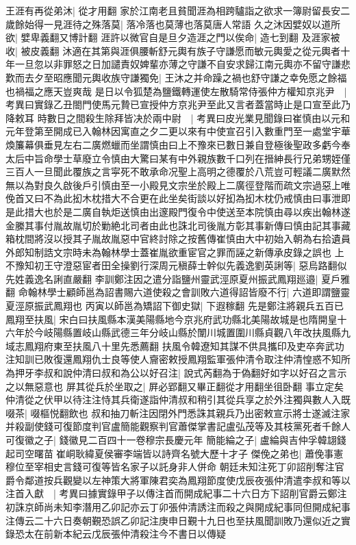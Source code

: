 王涯有再從弟沐|{
	從才用翻}
家於江南老且貧聞涯為相跨驢詣之欲求一簿尉留長安二歲餘始得一見涯待之殊落莫|{
	落冷落也莫薄也落莫唐人常語}
久之沐因嬖奴以道所欲|{
	嬖卑義翻又博計翻}
涯許以微官自是旦夕造涯之門以俟命|{
	造七到翻}
及涯家被收|{
	被皮義翻}
沐適在其第與涯俱腰斬舒元輿有族子守謙愿而敏元輿愛之從元輿者十年一旦忽以非罪怒之日加譴責奴婢輩亦薄之守謙不自安求歸江南元輿亦不留守謙悲歎而去夕至昭應聞元輿收族守謙獨免|{
	王沐之并命躁之禍也舒守謙之幸免愿之餘福也禍福之應天豈爽哉}
是日以令狐楚為鹽鐵轉運使左散騎常侍張仲方權知京兆尹　|{
	考異曰實錄乙丑閤門使馬元贄已宣授仲方京兆尹至此又言者蓋當時止是口宣至此乃降敕耳}
時數日之間殺生除拜皆决於兩中尉　|{
	考異曰皮光業見聞錄曰崔慎由以元和元年登第至開成已入翰林因寓直之夕二更以來有中使宣召引入數重門至一處堂宇華煥簾幕俱垂見左右二廣燃蠟而坐謂慎由曰上不豫來已數日兼自登極後聖政多虧今奉太后中旨命學士草廢立令慎由大驚曰某有中外親族數千口列在搢紳長行兄弟甥姪僅三百人一旦聞此覆族之言寜死不敢承命况聖上高明之德覆於八荒豈可輕議二廣默然無以為對良久啟後戶引慎由至一小殿見文宗坐於殿上二廣徑登階而疏文宗過惡上唯俛首又曰不為此抝木枕措大不合更在此坐矣街談以好抝為抝木枕仍戒慎由曰事泄即是此措大也於是二廣自執炬送慎由出邃殿門復令中使送至本院慎由尋以疾出翰林遂金縢其事付胤故胤切於勦絶北司者由此也誅北司後胤方彰其事新傳曰慎由記其事藏箱枕間將沒以授其子胤故胤惡中官終討除之按舊傳崔慎由大中初始入朝為右拾遺員外郎知制誥文宗時未為翰林學士蓋崔胤欲重宦官之罪而誣之新傳承皮錄之誤也}
上不豫知初王守澄惡宦者田全操劉行深周元稹薛士幹似先義逸劉英誗等|{
	惡烏路翻似先姓義逸名誗直嚴翻}
李訓鄭注因之遣分詣鹽州靈武涇原夏州振武鳳翔廵邉|{
	夏戶雅翻}
命翰林學士顧師邕為詔書賜六道使殺之會訓敗六道得詔皆廢不行|{
	六道即謂鹽靈夏涇原振武鳳翔也}
丙寅以師邕為矯詔下御史獄|{
	下遐稼翻}
先是鄭注將親兵五百已鳳翔至扶風|{
	宋白曰扶風縣本漢美陽縣地今京兆府武功縣北美陽故城是也隋開皇十六年於今岐陽縣置岐山縣武德三年分岐山縣於闈川城置圍川縣貞觀八年改扶風縣九域志鳳翔府東至扶風八十里先悉薦翻}
扶風令韓遼知其謀不供具攜印及吏卒奔武功注知訓已敗復還鳳翔仇士良等使人齎密敕授鳳翔監軍張仲清令取注仲清惶惑不知所為押牙李叔和說仲清曰叔和為公以好召注|{
	說式芮翻為于偽翻好如字以好召之言示之以無惡意也}
屏其從兵於坐取之|{
	屛必郢翻又畢正翻從才用翻坐徂卧翻}
事立定矣仲清從之伏甲以待注注恃其兵衛遂詣仲清叔和稍引其從兵享之於外注獨與數人入既啜茶|{
	啜樞悦翻飲也}
叔和抽刀斬注因閉外門悉誅其親兵乃出密敕宣示將士遂滅注家并殺副使錢可復節度判官盧簡能觀察判官蕭傑掌書記盧弘茂等及其枝黨死者千餘人可復徽之子|{
	錢徽見二百四十一卷穆宗長慶元年}
簡能綸之子|{
	盧綸與吉仲孚韓翃錢起司空曙苗崔峒耿緯夏侯審李端皆以詩齊名號大歷十才子}
傑俛之弟也|{
	蕭俛事憲穆位至宰相史言錢可復等皆名家子以託身非人併命}
朝廷未知注死丁卯詔削奪注官爵令鄰道按兵觀變以左神策大將軍陳君奕為鳳翔節度使戊辰夜張仲清遣李叔和等以注首入獻　|{
	考異曰據實錄甲子以傳注首而開成紀事二十六日方下詔削官爵云鄭注初誅京師尚未知李潛用乙卯記亦云丁卯張仲清誘注而殺之與開成紀事同但開成紀事注傳云二十六日奏朝覲恐誤乙卯記注庚申日覲十九日也至扶風聞訓敗乃還似近之實錄恐太在前新本紀云戊辰張仲清殺注今不書日以傳疑}
